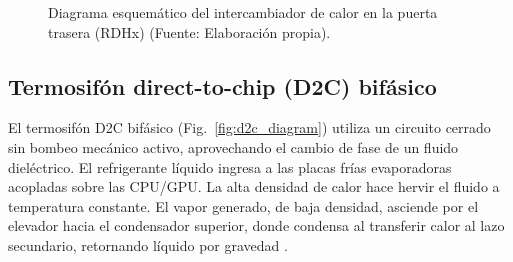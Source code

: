 \begin{figure}[htbp]
\centering
{}
\caption{Diagrama esquem\'atico del intercambiador de calor en la puerta trasera (RDHx) (Fuente: Elaboraci\'on propia).}
\label{fig:rdhx_diagram}
\end{figure}

\subsection{Termosif\'on direct-to-chip (D2C) bif\'asico}
El termosif\'on D2C bif\'asico (Fig.~\ref{fig:d2c_diagram}) utiliza un circuito cerrado sin bombeo mec\'anico activo, aprovechando el cambio de fase de un fluido diel\'ectrico. El refrigerante l\'iquido ingresa a las placas fr\'ias evaporadoras acopladas sobre las CPU/GPU. La alta densidad de calor hace hervir el fluido a temperatura constante. El vapor generado, de baja densidad, asciende por el elevador hacia el condensador superior, donde condensa al transferir calor al lazo secundario, retornando l\'iquido por gravedad \cite{garrity2014}.

